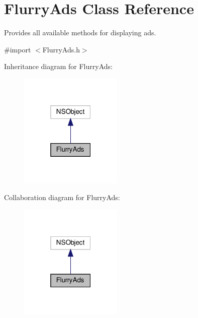 \hypertarget{interfaceFlurryAds}{}\section{Flurry\+Ads Class Reference}
\label{interfaceFlurryAds}


Provides all available methods for displaying ads.  




{\ttfamily \#import $<$Flurry\+Ads.\+h$>$}



Inheritance diagram for Flurry\+Ads\+:
\nopagebreak
\begin{figure}[H]
\begin{center}
\leavevmode
\includegraphics[width=139pt]{interfaceFlurryAds__inherit__graph}
\end{center}
\end{figure}


Collaboration diagram for Flurry\+Ads\+:
\nopagebreak
\begin{figure}[H]
\begin{center}
\leavevmode
\includegraphics[width=139pt]{interfaceFlurryAds__coll__graph}
\end{center}
\end{figure}
